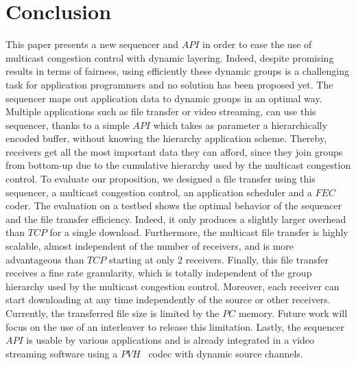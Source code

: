 \documentclass[a4paper]{article}
\begin{document}
\section{Conclusion}
    This paper presents a new sequencer and $API$ in order to ease the use of
    multicast congestion control with dynamic layering. Indeed, despite
    promising results in terms of fairness, using efficiently these dynamic
    groups is a challenging task for application programmers and no solution has
    been proposed yet.
The sequencer maps out application data to dynamic groups in an optimal way.
    Multiple applications such as file transfer or video streaming, can use this
    sequencer, thanks to a simple $API$ which takes as parameter a
    hierarchically encoded buffer, without knowing the hierarchy application
    scheme.  Thereby, receivers get all the most important data they can afford,
    since they join groups from bottom-up due to the cumulative hierarchy used
    by the multicast congestion control. 
To evaluate our proposition, we designed a file transfer using
    this sequencer, a multicast congestion control, an application scheduler and
    a $FEC$ coder.
The evaluation on a testbed shows the optimal behavior of the sequencer and
    the file transfer efficiency.  Indeed, it only produces a slightly larger
    overhead than $TCP$ for a single download.  Furthermore, the multicast file
    transfer is highly scalable, almost independent of the number of receivers,
    and is more advantageous than $TCP$ starting at only $2$ receivers.
Finally, this file transfer receives a fine rate granularity, which
    is totally independent of the group hierarchy used by the multicast
    congestion control. Moreover, each receiver can start downloading at any
    time independently of the source or other receivers.
Currently, the transferred file size is limited by the $PC$ memory.
    Future work will focus on the use of an interleaver to release this
    limitation.
Lastly, the sequencer $API$ is usable by various applications and is already
    integrated in a video streaming software using a
    $PVH$~\cite{mccanne_low-complexity_1997} codec with dynamic source channels.



\end{document}
